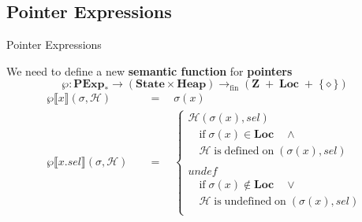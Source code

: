 \documentclass[xcolor=svgnames,11pt]{beamer}
\begin{document}
\subsection{Pointer Expressions}
\begin{frame}{Pointer Expressions}

We need to define a new \textbf{semantic function} for \textbf{pointers}
$$ \wp : \mathbf{PExp_*} \rightarrow (\mathbf{State} \times \mathbf{Heap}) \rightarrow_{\mathrm{fin}} (\mathbf{Z} \;+\; \mathbf{Loc} \;+\; \{\diamond\} ) $$
\begin{align*}
\wp \llbracket x \rrbracket (\sigma, \mathcal{H}) \quad &= \quad \sigma(x) \\
\wp \llbracket x.sel \rrbracket (\sigma, \mathcal{H}) \quad &= \quad \left\{
\begin{array}{l}
\mathcal{H}(\sigma(x),sel) \\
\quad\mathrm{if}\; \sigma(x) \in \mathbf{Loc} \quad \wedge \\ 
\quad\mathcal{H}\; \mathrm{is\;defined\;on\;} (\sigma(x), sel) \\
\\
undef \\
\quad\mathrm{if}\; \sigma(x) \not\in \mathbf{Loc} \quad \vee \\
\quad\mathcal{H}\; \mathrm{is\;undefined\;on\;} (\sigma(x), sel) \\
\end{array}
\right.
\end{align*}
\end{frame}
\end{document}
